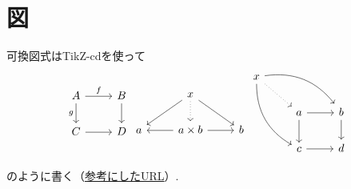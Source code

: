 \documentclass[11pt,a4paper,oneside,lualatex]{ltjsarticle} %
\numberwithin{equation}{section} %
\begin{document}

\section{図} \label{sec:diag}


可換図式はTikZ-cdを使って
\begin{equation}
\begin{tikzcd}
	A \ar[r, "f"] \arrow[d, "g"'] & B \ar[d] \\
	C \ar[r] & D
\end{tikzcd}
\begin{tikzcd}
	& x \arrow[ld] \arrow[d, dotted] \arrow[rd] & \\
	a & a\times b \arrow[l] \arrow[r] & b
\end{tikzcd}
\begin{tikzcd}
	x \arrow[ddr, bend right] \arrow[rrd, bend left] \arrow[rd, dotted] & & \\
	& a \arrow[r] \arrow[d] & b \arrow[d] \\
	& c \arrow[r] & d
\end{tikzcd}
\end{equation}

のように書く（\href{https://blog.miz-ar.info/2017/06/commutative-diagrams-in-latex/}{参考にしたURL}）.

%

\end{document}
